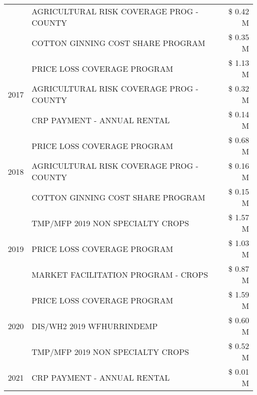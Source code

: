 \begin{tabular}{llr}
 & AGRICULTURAL RISK COVERAGE PROG - COUNTY & \$ 0.42 M \\
 & COTTON GINNING COST SHARE PROGRAM & \$ 0.35 M \\
\cline{1-3}
\multirow[t]{3}{*}{2017} & PRICE LOSS COVERAGE PROGRAM & \$ 1.13 M \\
 & AGRICULTURAL RISK COVERAGE PROG - COUNTY & \$ 0.32 M \\
 & CRP PAYMENT - ANNUAL RENTAL & \$ 0.14 M \\
\cline{1-3}
\multirow[t]{3}{*}{2018} & PRICE LOSS COVERAGE PROGRAM & \$ 0.68 M \\
 & AGRICULTURAL RISK COVERAGE PROG - COUNTY & \$ 0.16 M \\
 & COTTON GINNING COST SHARE PROGRAM & \$ 0.15 M \\
\cline{1-3}
\multirow[t]{3}{*}{2019} & TMP/MFP 2019 NON SPECIALTY CROPS & \$ 1.57 M \\
 & PRICE LOSS COVERAGE PROGRAM & \$ 1.03 M \\
 & MARKET FACILITATION PROGRAM - CROPS & \$ 0.87 M \\
\cline{1-3}
\multirow[t]{3}{*}{2020} & PRICE LOSS COVERAGE PROGRAM & \$ 1.59 M \\
 & DIS/WH2 2019 WFHURRINDEMP & \$ 0.60 M \\
 & TMP/MFP 2019 NON SPECIALTY CROPS & \$ 0.52 M \\
\cline{1-3}
2021 & CRP PAYMENT - ANNUAL RENTAL & \$ 0.01 M \\
\cline{1-3}
\bottomrule
\end{tabular}
